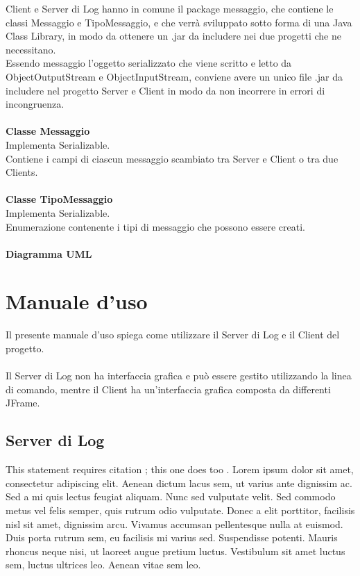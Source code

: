 \documentclass[a4paper, 11pt]{article} %
\begin{document}
Client e Server di Log hanno in comune il package messaggio, che contiene le classi Messaggio e TipoMessaggio, e che verr\`a sviluppato sotto forma di una Java Class Library, in modo da ottenere un .jar da includere nei due progetti che ne necessitano.\\
Essendo messaggio l'oggetto serializzato che viene scritto e letto da ObjectOutputStream e ObjectInputStream, conviene avere un unico file .jar da includere nel progetto Server e Client in modo da non incorrere in errori di incongruenza.\\
\\
\textbf{Classe Messaggio}\\
Implementa Serializable.\\
Contiene i campi di ciascun messaggio scambiato tra Server e Client o tra due Clients.\\
\\
\textbf{Classe TipoMessaggio}\\
Implementa Serializable.\\
Enumerazione contenente i tipi di messaggio che possono essere creati.\\
\\
\textbf{Diagramma UML}

\newpage
\section{Manuale d'uso}

Il presente manuale d'uso spiega come utilizzare il Server di Log e il Client del progetto.\\
\\
Il Server di Log non ha interfaccia grafica e pu\`o essere gestito utilizzando la linea di comando, mentre il Client ha un'interfaccia grafica composta da differenti JFrame.

\subsection{Server di Log}

This statement requires citation \cite{Smith:2012qr}; this one does too \cite{Smith:2013jd}. Lorem ipsum dolor sit amet, consectetur adipiscing elit. Aenean dictum lacus sem, ut varius ante dignissim ac. Sed a mi quis lectus feugiat aliquam. Nunc sed vulputate velit. Sed commodo metus vel felis semper, quis rutrum odio vulputate. Donec a elit porttitor, facilisis nisl sit amet, dignissim arcu. Vivamus accumsan pellentesque nulla at euismod. Duis porta rutrum sem, eu facilisis mi varius sed. Suspendisse potenti. Mauris rhoncus neque nisi, ut laoreet augue pretium luctus. Vestibulum sit amet luctus sem, luctus ultrices leo. Aenean vitae sem leo.
\end{document}
